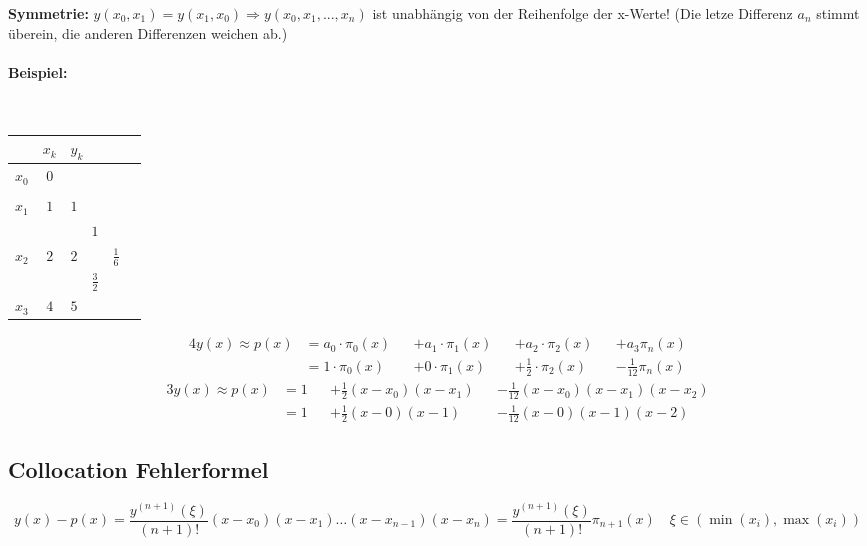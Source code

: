 \textbf{Symmetrie:} $y(x_0,x_1) = y(x_1,x_0) \Longrightarrow y(x_0,x_1,...,x_n)$ ist unabhängig von der Reihenfolge der x-Werte! (Die letze Differenz $a_n$ stimmt überein, die anderen Differenzen weichen ab.)

\paragraph{Beispiel:}~\\
\begin{minipage}[c]{6.0cm}
	\begin{tabular}{|c||c|llll|}
	\hline
			&$x_k$	&\multicolumn{4}{l|}{$y_k$}\\
	\hline
	$x_0$	&$0$	&\kreisS{$1$}{$a_0$}&			&			&\\
		 	&		&			&\kreisS{$0$}{$a_1$}&			&\\
	$x_1$	&$1$	&$1$		&			&\kreisM{$\frac 12$}{$a_2$}&\\
			&		&			&$1$		&			&\kreisB{$-\frac{1}{12}$}{$a_3$}\\
	$x_2$	&$2$	&$2$		&			&$\frac 16$&\\
			&		&			&$\frac{3}{2}$		&			&\\
	$x_3$	&$4$	&$5$		&			&			&\\
	\hline
	\end{tabular}
\end{minipage}
\hfill
\begin{minipage}[c]{13cm}
	\begin{alignat}{4}
		y(x)\approx p(x)&=a_0\cdot \pi_0(x) &&+a_1\cdot\pi_1(x)  &&+a_2\cdot\pi_2(x)&&+ a_3\pi_n(x)\nonumber\\[0.3cm]
		&=1\cdot \pi_0(x) &&+0\cdot\pi_1(x)  &&+\frac 12\cdot\pi_2(x)&&- \frac 1{12}\pi_n(x)\nonumber %
	\end{alignat}
	\begin{alignat}{3}
	y(x)\approx p(x)&=1&&+\frac 12(x-x_0)(x-x_1)&&-\frac 1{12} (x-x_0)(x-x_1)(x-x_2)\nonumber\\[0.3cm]
	&=1&&+\frac 12(x-0)(x-1)&&-\frac 1{12} (x-0)(x-1)(x-2)\nonumber
	\end{alignat}
\end{minipage}


\subsection{Collocation Fehlerformel}
$$y(x)-p(x) = \frac{y^{(n+1)}(\xi)}{(n+1)!} (x-x_0)(x-x_1)\ldots(x-x_{n-1})(x-x_n) = \frac{y^{(n+1)}(\xi)}{(n+1)!}\pi_{n+1}(x) \quad \xi \in (\min(x_i), \max(x_i))$$

